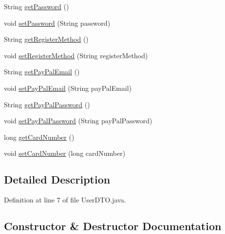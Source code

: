 \begin{DoxyCompactItemize}
String \mbox{\hyperlink{class_s_p_q_1_1dto_1_1_user_d_t_o_a955f436e60336683283a6fcd6fc5f874}{get\+Password}} ()
\item 
void \mbox{\hyperlink{class_s_p_q_1_1dto_1_1_user_d_t_o_a35bd2d50e194e3d923e8adcf229e5a3e}{set\+Password}} (String password)
\item 
String \mbox{\hyperlink{class_s_p_q_1_1dto_1_1_user_d_t_o_ab2180112e27f967d77dd4696f88bd2ef}{get\+Register\+Method}} ()
\item 
void \mbox{\hyperlink{class_s_p_q_1_1dto_1_1_user_d_t_o_a8e4fb216f49f13c196598119a15556ea}{set\+Register\+Method}} (String register\+Method)
\item 
String \mbox{\hyperlink{class_s_p_q_1_1dto_1_1_user_d_t_o_a42f2eecae334e6e937419b1c201cb1f2}{get\+Pay\+Pal\+Email}} ()
\item 
void \mbox{\hyperlink{class_s_p_q_1_1dto_1_1_user_d_t_o_ab166e73261db557f7fce5a47adf955f0}{set\+Pay\+Pal\+Email}} (String pay\+Pal\+Email)
\item 
String \mbox{\hyperlink{class_s_p_q_1_1dto_1_1_user_d_t_o_ab024e5157674f9bc382edfda06c348ec}{get\+Pay\+Pal\+Password}} ()
\item 
void \mbox{\hyperlink{class_s_p_q_1_1dto_1_1_user_d_t_o_afe549d85cf389f5f7aa90eb8a0f1a6d8}{set\+Pay\+Pal\+Password}} (String pay\+Pal\+Password)
\item 
long \mbox{\hyperlink{class_s_p_q_1_1dto_1_1_user_d_t_o_a6ffd8dce998a3e1756aa82e7b2981dd4}{get\+Card\+Number}} ()
\item 
void \mbox{\hyperlink{class_s_p_q_1_1dto_1_1_user_d_t_o_a9f35044d63cd9769575a5ec019dc9cca}{set\+Card\+Number}} (long card\+Number)
\end{DoxyCompactItemize}


\subsection{Detailed Description}


Definition at line 7 of file User\+D\+T\+O.\+java.



\subsection{Constructor \& Destructor Documentation}
\mbox{\label{class_s_p_q_1_1dto_1_1_user_d_t_o_a40cad7b1dea2117ed4cb0e69fdc6b929}} 
